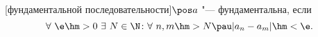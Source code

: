 [фундаментальной последовательности]$\pos a$ "--- фундаментальна, если \[\forall\  \e\hm>0\ \exists\  N\in\N\colon \forall\  n,m\hm>N\pau |a_n-a_m|\hm<\e.\]
